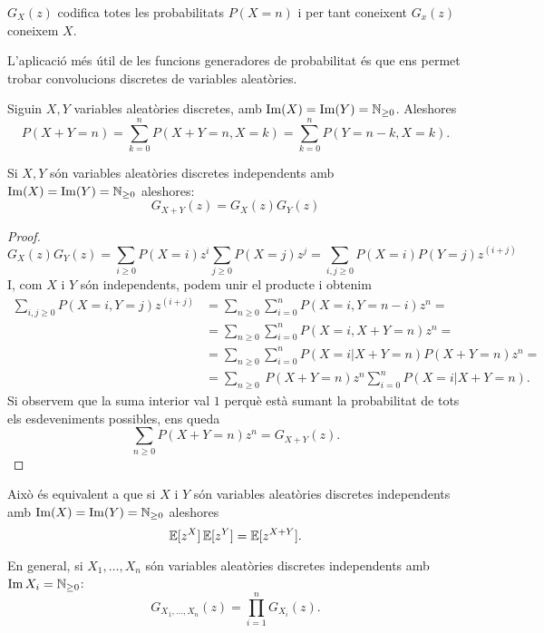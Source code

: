 \begin{obs}
    $G_X(z)$ codifica totes les probabilitats $P(X = n)$ i per tant coneixent
    $G_x(z)$ coneixem $X$.
\end{obs}

L'aplicació m\'es útil de les funcions generadores de probabilitat \'es que
ens permet trobar convolucions discretes de variables aleatòries.

\begin{obs}
    Siguin $X, Y$ variables aleatòries discretes, amb $\operatorname{Im}(X) = \operatorname{Im}(Y) =
    \mathbb{N}_{\geq 0}$. Aleshores
    \[
        P(X+Y = n) = \sum_{k = 0}^{n} P(X+Y = n, X = k) = 
        \sum_{k = 0}^{n} P(Y = n-k, X = k). 
    \]
\end{obs}

\begin{prop}
    Si $X, Y$ són variables aleatòries discretes independents amb $\operatorname{Im}(X) = \operatorname{Im}(Y) =
    \mathbb{N}_{\geq 0}$ aleshores:
    \[
        G_{X+Y}(z) = G_X(z)G_Y(z)
    \]
\end{prop}

\begin{proof}
    \[
        G_X(z)G_Y(z) = \sum_{i \geq 0} P(X = i) z^i  \sum_{j \geq 0} P(X = j) z^j =
         \sum_{i, j \geq 0} P(X = i)P(Y = j) z^{(i+j)}
    \]
    I, com $X$ i $Y$ són independents, podem unir el producte i obtenim
    \begin{align*} 
        \sum_{i, j \geq 0} P(X = i, Y = j) z^{(i+j)} & = \sum_{n \geq 0} \sum_{i = 0}^n
        P(X = i, Y = n-i)z^n =\\
        &= \sum_{n \geq 0} \sum_{i = 0}^n P(X = i, X+Y = n)z^n =\\
        & = \sum_{n \geq 0} \sum_{i = 0}^n P(X = i | X+Y = n) P(X+Y = n)z^n = \\
        & = \sum_{n \geq 0} \ P(X+Y = n)z^n \sum_{i = 0}^n P(X = i | X+Y = n).
    \end{align*}
    Si observem que la suma interior val $1$ perquè està sumant la probabilitat de tots
    els esdeveniments possibles, ens queda
    \[
        \sum_{n \geq 0} P(X+Y = n)z^n = G_{X+Y}(z).
    \]
\end{proof}

\begin{obs}
    Això \'es equivalent a que si $X$ i $Y$ són variables aleatòries discretes independents
    amb $\operatorname{Im}(X) = \operatorname{Im}(Y) = \mathbb{N}_{\geq 0}$ aleshores
    \[
        \operatorname{\mathbb{E}}[z^X]\operatorname{\mathbb{E}}[z^Y] = \operatorname{\mathbb{E}}[z^{X+Y}].
    \]
\end{obs}

\begin{obs}
    En general, si $X_1, \dots, X_n$ són variables aleatòries discretes independents amb
    $\operatorname{Im} X_i = \mathbb{N}_{\geq 0}$:
    \[
        G_{X_1,\dots,X_n}(z) = \prod_{i = 1}^n G_{X_i}(z).
    \]
\end{obs}

